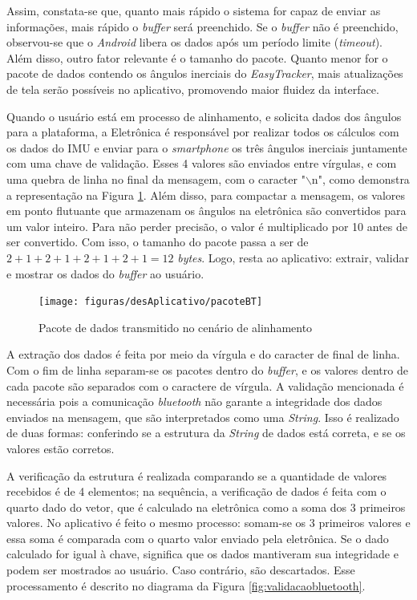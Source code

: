 Assim, constata-se que, quanto mais rápido o sistema for capaz de enviar as informações, mais rápido o \textit{buffer} será preenchido. Se o \textit{buffer} não é preenchido, observou-se que o \textit{Android} libera os dados após um período limite (\textit{timeout}). Além disso, outro fator relevante é o tamanho do pacote. Quanto menor for o pacote de dados contendo os ângulos inerciais do \textit{EasyTracker}, mais atualizações de tela serão possíveis no aplicativo, promovendo maior fluidez da interface. 

Quando o usuário está em processo de alinhamento, e solicita dados dos ângulos para a plataforma, a Eletrônica é responsável por realizar todos os cálculos com os dados do IMU e enviar para o \textit{smartphone} os três ângulos inerciais juntamente com uma chave de validação. Esses 4 valores são enviados entre vírgulas, e com uma quebra de linha no final da mensagem, com o caracter "$\backslash$n", como demonstra a representação na Figura \ref{fig:pacoteBT}. Além disso, para compactar a mensagem, os valores em ponto flutuante que armazenam os ângulos na eletrônica são convertidos para um valor inteiro. Para não perder precisão, o valor é multiplicado por 10 antes de ser convertido. Com isso, o tamanho do pacote passa a ser de $ 2+1+2+1+2+1+2+1 = 12 $ \textit{bytes}. Logo, resta ao aplicativo: extrair, validar e mostrar os dados do \textit{buffer} ao usuário.

\begin{figure}[!htb]
	\centering
	\caption{Pacote de dados transmitido no cenário de alinhamento}
	\texttt{[image: figuras/desAplicativo/pacoteBT]}
	\label{fig:pacoteBT}
\end{figure}

A extração dos dados é feita por meio da vírgula e do caracter de final de linha. Com o fim de linha separam-se os pacotes dentro do \textit{buffer}, e os valores dentro de cada pacote são separados com o caractere de vírgula. A validação mencionada é necessária pois a comunicação \textit{bluetooth} não garante a integridade dos dados enviados na mensagem, que são interpretados como uma \textit{String}. Isso é realizado de duas formas: conferindo se a estrutura da \textit{String} de dados está correta, e se os valores estão corretos. 

A verificação da estrutura é realizada comparando se a quantidade de valores recebidos é de 4 elementos; na sequência, a verificação de dados é feita com o quarto dado do vetor, que é calculado na eletrônica como a soma dos 3 primeiros valores. No aplicativo é feito o mesmo processo: somam-se os 3 primeiros valores e essa soma é comparada com o quarto valor enviado pela eletrônica. Se o dado calculado for igual à chave, significa que os dados mantiveram sua integridade e podem ser mostrados ao usuário. Caso contrário, são descartados. Esse processamento é descrito no diagrama da Figura \ref{fig:validacaobluetooth}.


